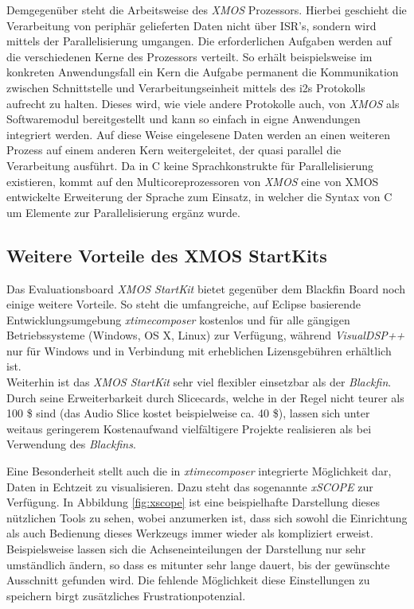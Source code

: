 \documentclass[paper=a4, fontsize=12pt]{scrartcl}
\numberwithin{equation}{section}		%
\numberwithin{figure}{section}			%
\numberwithin{table}{section}				%
\begin{document}
Demgegenüber steht die Arbeitsweise des \textit{XMOS} Prozessors. Hierbei geschieht die Verarbeitung von periphär gelieferten Daten nicht über ISR's, sondern wird mittels der Parallelisierung umgangen. Die erforderlichen Aufgaben werden auf die verschiedenen Kerne des Prozessors verteilt. So erhält beispielsweise im konkreten Anwendungsfall ein Kern die Aufgabe permanent die Kommunikation zwischen Schnittstelle und Verarbeitungseinheit mittels des i2s Protokolls aufrecht zu halten. Dieses wird, wie viele andere Protokolle auch, von \textit{XMOS} als Softwaremodul bereitgestellt und kann so einfach in eigne Anwendungen integriert werden. Auf diese Weise eingelesene Daten werden an einen weiteren Prozess auf einem anderen Kern weitergeleitet, der quasi parallel die Verarbeitung ausführt.
Da in C keine Sprachkonstrukte für Parallelisierung existieren, kommt auf den Multicoreprozessoren von \textit{XMOS} eine von XMOS entwickelte Erweiterung der Sprache zum Einsatz, in welcher die Syntax von C um Elemente zur Parallelisierung ergänz wurde.

\subsection{Weitere Vorteile des XMOS StartKits}

Das Evaluationsboard \textit{XMOS StartKit} bietet gegenüber dem Blackfin Board noch einige weitere Vorteile. So steht die umfangreiche, auf Eclipse basierende Entwicklungsumgebung \textit{xtimecomposer} kostenlos und für alle gängigen Betriebssysteme (Windows, OS X, Linux) zur Verfügung, während \textit{VisualDSP++} nur für Windows und in Verbindung mit erheblichen Lizensgebühren erhältlich ist.\\

Weiterhin ist das \textit{XMOS StartKit} sehr viel flexibler einsetzbar als der \textit{Blackfin}. Durch seine Erweiterbarkeit durch Slicecards, welche in der Regel nicht teurer als 100 \$ sind (das Audio Slice kostet beispielweise ca. 40 \$), lassen sich unter weitaus geringerem Kostenaufwand vielfältigere Projekte realisieren als bei Verwendung des \textit{Blackfins}.

Eine Besonderheit stellt auch die in \textit{xtimecomposer} integrierte Möglichkeit dar, Daten in Echtzeit zu visualisieren. Dazu steht das sogenannte \textit{xSCOPE} zur Verfügung. In Abbildung \ref{fig:xscope} ist eine beispielhafte Darstellung dieses nützlichen Tools zu sehen, wobei anzumerken ist, dass sich sowohl die Einrichtung als auch Bedienung dieses Werkzeugs immer wieder als kompliziert erweist. Beispielsweise lassen sich die Achseneinteilungen der Darstellung nur sehr umständlich ändern, so dass es mitunter sehr lange dauert, bis der gewünschte Ausschnitt gefunden wird. Die fehlende Möglichkeit diese Einstellungen zu speichern birgt zusätzliches Frustrationpotenzial.
\end{document}

